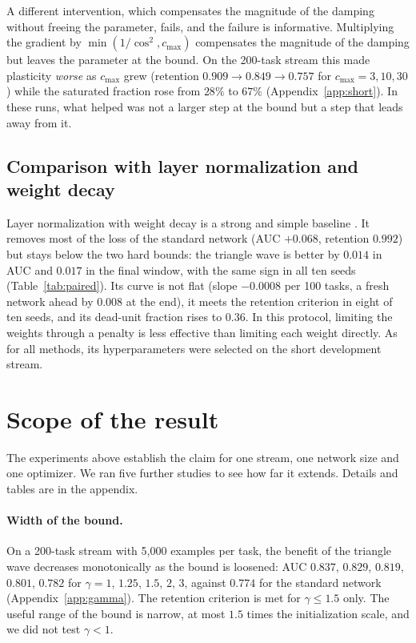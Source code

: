 \documentclass[11pt,a4paper]{article}
\begin{document}
A different intervention, which compensates the magnitude of the damping without freeing the parameter,
fails, and the failure is informative. Multiplying the gradient by
$\min(1/\cos^2,c_{\max})$ compensates the magnitude of the damping but leaves the parameter at the bound.
On the 200-task stream this made plasticity \emph{worse} as $c_{\max}$ grew (retention $0.909\to0.849\to0.757$
for $c_{\max}=3,10,30$) while the saturated fraction rose from $28\%$ to $67\%$ (Appendix~\ref{app:short}).
In these runs, what helped was not a larger step at the bound but a step that leads away from it.

\subsection{Comparison with layer normalization and weight decay}\label{sec:lnwd}

Layer normalization with weight decay is a strong and simple baseline \citep{lyle2024disentangling}. It
removes most of the loss of the standard network (AUC $+0.068$, retention $0.992$) but stays below the two
hard bounds: the triangle wave is better by $0.014$ in AUC and $0.017$ in the final window, with the same sign
in all ten seeds (Table~\ref{tab:paired}). Its curve is not flat (slope $-0.0008$ per 100 tasks, a fresh
network ahead by $0.008$ at the end), it meets the retention criterion in eight of ten seeds, and its
dead-unit fraction rises to $0.36$. In this protocol, limiting the weights through a penalty is less
effective than limiting each weight directly. As for all methods, its hyperparameters were selected on the
short development stream.

\section{Scope of the result}\label{sec:scope}

The experiments above establish the claim for one stream, one network size and one optimizer. We ran five
further studies to see how far it extends. Details and tables are in the appendix.

\paragraph{Width of the bound.} On a 200-task stream with 5{,}000 examples per task, the benefit of the
triangle wave decreases monotonically as the bound is loosened: AUC $0.837$, $0.829$, $0.819$, $0.801$,
$0.782$ for $\gamma=1$, $1.25$, $1.5$, $2$, $3$, against $0.774$ for the standard network
(Appendix~\ref{app:gamma}). The retention criterion is met for $\gamma\le1.5$ only. The useful range of the
bound is narrow, at most $1.5$ times the initialization scale, and we did not test $\gamma<1$.
\end{document}
